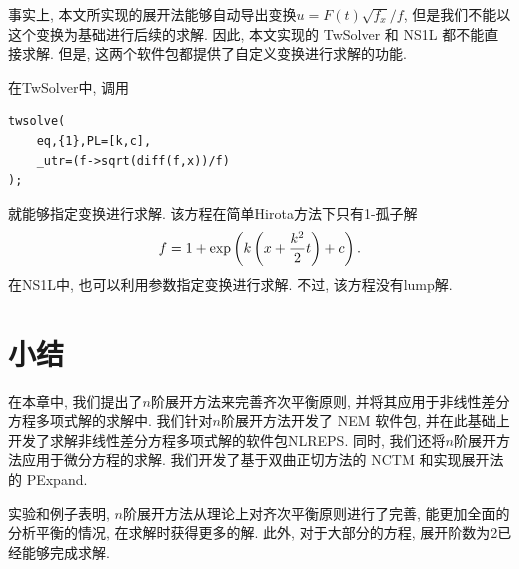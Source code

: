 事实上, 本文所实现的\Painleve{}展开法能够自动导出变换$u=F(t)\sqrt{f_x}/f$, 但是我们不能以这个变换为基础进行后续的求解.  因此, 本文实现的 TwSolver 和 NS1L 都不能直接求解. 但是, 这两个软件包都提供了自定义变换进行求解的功能.

在TwSolver中, 调用
\begin{verbatim}
twsolve(
    eq,{1},PL=[k,c],
    _utr=(f->sqrt(diff(f,x))/f)
);
\end{verbatim}
就能够指定变换进行求解. 该方程在简单Hirota方法下只有1-孤子解
\begin{equation}
    f=1+\exp\left(k\left(x+\frac{k^2}{2}t\right)+c\right).
\end{equation}
在NS1L中, 也可以利用参数指定变换进行求解. 不过, 该方程没有lump解.

\section{小结}\label{ch4sec7}

在本章中, 我们提出了$n$阶展开方法来完善齐次平衡原则, 并将其应用于非线性差分方程多项式解的求解中. 我们针对$n$阶展开方法开发了 NEM 软件包, 并在此基础上开发了求解非线性差分方程多项式解的软件包NLREPS. 同时, 我们还将$n$阶展开方法应用于微分方程的求解. 我们开发了基于双曲正切方法的 NCTM 和实现\Painleve{}展开法的 PExpand. 

实验和例子表明, $n$阶展开方法从理论上对齐次平衡原则进行了完善, 能更加全面的分析平衡的情况, 在求解时获得更多的解. 此外, 对于大部分的方程, 展开阶数为2已经能够完成求解. 

